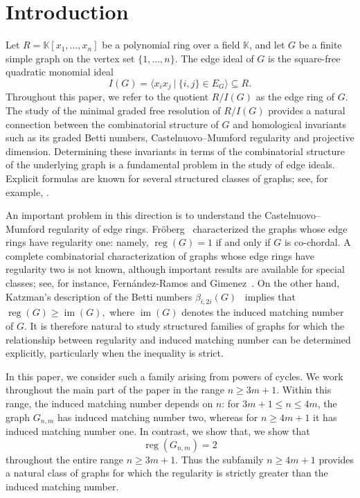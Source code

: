 \documentclass[12pt,reqno]{amsart}
\theoremstyle{definition}
\numberwithin{equation}{section}
\def\C{\mathcal{C}}
\def\K{\mathbb{K}}
\newcommand{\reg}{\operatorname{reg}}
\begin{document}
\maketitle

\section{Introduction}
\noindent
Let $R=\K[x_1,\ldots,x_n]$ be a polynomial ring over a field $\K$, and
let $G$ be a finite simple graph on the vertex set $\{1,\ldots,n\}$.
The edge ideal of $G$ is the square-free quadratic monomial ideal
\[
I(G)=\langle x_ix_j~|~\{i,j\}\in E_G\rangle\subseteq R.
\]
Throughout this paper, we refer to the quotient $R/I(G)$ as the edge
ring of $G$. The study of the minimal graded free resolution of
$R/I(G)$ provides a natural connection between the combinatorial
structure of $G$ and homological invariants such as its graded Betti
numbers, Castelnuovo--Mumford regularity and projective dimension.
Determining these invariants in terms of the combinatorial structure of
the underlying graph is a fundamental problem in the study of edge
ideals. Explicit formulas are known for several structured classes of
graphs; see, for example,
\cite{hatu,hawo,RatherCrown,RatherTriangular,vill,wood}.

An important problem in this direction is to understand the
Castelnuovo--Mumford regularity of edge rings. Fr\"oberg~\cite[Theorem~1]{frob}
characterized the graphs whose edge rings have regularity one: namely,
$\reg(G)=1$ if and only if $G$ is co-chordal. A complete combinatorial
characterization of graphs whose edge rings have regularity two is not
known, although important results are available for special classes;
see, for instance, Fern\'andez-Ramos and
Gimenez~\cite[Theorem~3.1]{fera}. On the other hand,
Katzman's description of the Betti numbers
$\beta_{i,2i}(G)$~\cite[Lemma~2.2]{katzman} implies that \( \reg(G)\geq\operatorname{im}(G), \)
where $\operatorname{im}(G)$ denotes the induced matching number of $G$.
It is therefore natural to study structured families of graphs for
which the relationship between regularity and induced matching number
can be determined explicitly, particularly when the inequality is
strict.

In this paper, we consider such a family arising from powers of cycles.
We work throughout the main part of the paper in the range
$n\geq3m+1$. Within this range, the induced matching number depends on
$n$: for $3m+1\leq n\leq4m$, the graph $G_{n,m}$ has induced matching
number two, whereas for $n\geq4m+1$ it has induced matching number one.
In contrast, we show that, we show that
\[
\reg(G_{n,m})=2
\]
throughout the entire range $n\geq3m+1$. Thus the subfamily
$n\geq4m+1$ provides a natural class of graphs for which the regularity
is strictly greater than the induced matching number.
\end{document}
